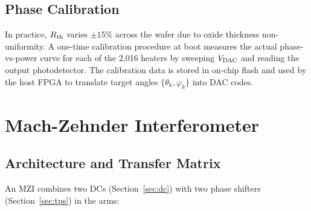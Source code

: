 \documentclass[12pt, a4paper]{article}
\begin{document}
\subsection{Phase Calibration}

In practice, $R_{\rm th}$ varies $\pm15\%$ across the wafer due to oxide
thickness non-uniformity.
A one-time calibration procedure at boot measures the actual
phase-vs-power curve for each of the 2,016 heaters by sweeping
$V_{\rm DAC}$ and reading the output photodetector.
The calibration data is stored in on-chip flash and used by the host
FPGA to translate target angles $\{\theta_k,\varphi_k\}$ into DAC codes.

\section{Mach-Zehnder Interferometer}
\label{sec:mzi}

\subsection{Architecture and Transfer Matrix}

An MZI combines two DCs (Section~\ref{sec:dc}) with two
phase shifters (Section~\ref{sec:tps}) in the arms:
\end{document}
